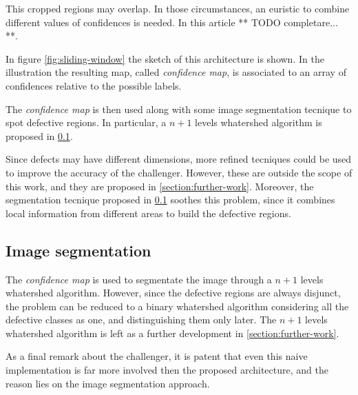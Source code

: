         \par{
            This cropped regions may overlap. In those circumstances, an euristic to combine different values of confidences is needed. In this article ** TODO completare... **.
        }
        \par{
            In figure \ref{fig:sliding-window} the sketch of this architecture is shown. In the illustration the resulting map, called \emph{confidence map}, is associated to an array of confidences relative to the possible labels. 
        }
        \par{
            The \emph{confidence map} is then used along with some image segmentation tecnique to spot defective regions. In particular, a $n+1$ levels whatershed algorithm is proposed in \ref{section:challenger:image-segmentation}.
        }
        \par{
            Since defects may have different dimensions, more refined tecniques could be used to improve the accuracy of the challenger. However, these are outside the scope of this work, and they are proposed in \ref{section:further-work}. Moreover, the segmentation tecnique proposed in \ref{section:challenger:image-segmentation} soothes this problem, since it combines local information from different areas to build the defective regions.
        }
    \subsection{Image segmentation}\label{section:challenger:image-segmentation}
        \par{
            The \emph{confidence map} is used to segmentate the image through a $n+1$ levels whatershed algorithm. However, since the defective regions are always disjunct, the problem can be reduced to a binary whatershed algorithm \cite{ieee:87344} considering all the defective classes as one, and distinguishing them only later. The $n+1$ levels whatershed algorithm is left as a further development in \ref{section:further-work}.
        }
        \par{
            As a final remark about the challenger, it is patent that even this naive implementation is far more involved then the proposed architecture, and the reason lies on the image segmentation approach.
        }